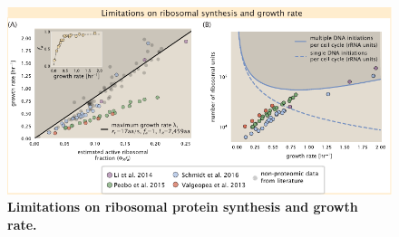 
\begin{figure}
    \begin{fullwidth}
    \includegraphics{main_figs/fig10_ribosome_as_limit_update.pdf}
    \caption{\textbf{Limitations on ribosomal protein synthesis and growth rate.}  }\label{fig:ribosome_limit}
    \end{fullwidth}
\end{figure}

